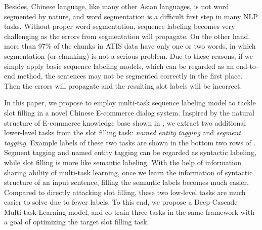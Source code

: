 Besides, Chinese language, like many other Asian languages, is not
word segmented by nature, and word segmentation is a difficult
first step in many NLP tasks.
Without proper word segmentation, sequence labeling becomes very challenging
as the errors from segmentation will propagate.
On the other hand, more than 97\% of the chunks in ATIS data 
have only one or two words,
in which segmentation (or chunking) is not a serious problem.
Due to these reasons,
if we simply apply basic sequence labeling models,
which can be regarded as an end-to-end method,
the sentences may not be segmented correctly in the first place.
Then the errors will propagate and the resulting slot labels will be incorrect.

In this paper, we propose to employ multi-task sequence labeling model
to tackle slot filling in a novel Chinese E-commerce dialog system.
Inspired by the natural structure of E-commerce knowledge base shown in ,
we extract two additional lower-level tasks from the slot filling task: 
{\em named entity tagging} and {\em segment tagging}.
Example labels of these two tasks 
are shown in the bottom two rows of .
Segment tagging and named entity tagging can be regarded as 
syntactic labeling, 
while slot filling is more like semantic labeling.
With the help of information sharing ability of multi-task learning,
once we learn the information of syntactic structure of an input sentence,
filling the semantic labels becomes much easier.
Compared to directly attacking slot filling,
these two low-level tasks are much easier to solve
due to fewer labels.
To this end, we propose a Deep Cascade Multi-task Learning model,
and co-train three tasks in the same framework
with a goal of optimizing the target slot filling task.

